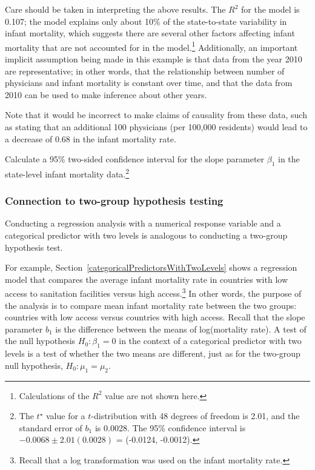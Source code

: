 Care should be taken in interpreting the above results. The $R^2$ for the model is 0.107; the model explains only about 10\% of the state-to-state variability in infant mortality, which suggests there are several other factors affecting infant mortality that are not accounted for in the model.\footnote{Calculations of the $R^2$ value are not shown here.} Additionally, an important implicit assumption being made in this example is that data from the year 2010 are representative; in other words, that the relationship between number of physicians and infant mortality is constant over time, and that the data from 2010 can be used to make inference about other years.

Note that it would be incorrect to make claims of causality from these data, such as stating that an additional 100 physicians (per 100,000 residents) would lead to a decrease of 0.68 in the infant mortality rate.

\begin{exercise} Calculate a 95\% two-sided confidence interval for the slope parameter $\beta_{1}$ in the state-level infant mortality data.\footnote{The $t^{\star}$ value for a $t$-distribution with 48 degrees of freedom is 2.01, and the standard error of $b_1$ is 0.0028. The 95\% confidence interval is $-0.0068 \pm 2.01(0.0028)$ = (-0.0124, -0.0012). } 
\end{exercise}

\subsubsection{Connection to two-group hypothesis testing}
\label{categoricalTwoGroup}

Conducting a regression analysis with a numerical response variable and a categorical predictor with two levels is analogous to conducting a two-group hypothesis test. 

For example, Section~\ref{categoricalPredictorsWithTwoLevels} shows a regression model that compares the average infant mortality rate in countries with low access to sanitation facilities versus high access.\footnote{Recall that a log transformation was used on the infant mortality rate.} In other words, the purpose of the analysis is to compare mean infant mortality rate between the two groups: countries with low access versus countries with high access. Recall that the slope parameter $b_1$ is the difference between the means of log(mortality rate). A test of the null hypothesis $H_0: \beta_1 = 0$ in the context of a categorical predictor with two levels is a test of whether the two means are different, just as for the two-group null hypothesis, $H_0: \mu_1 = \mu_2$. 

